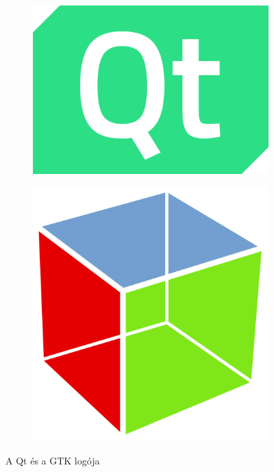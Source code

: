 \begin{figure}[h]
	\centering
	\begin{subfigure}{0.4\textwidth}
		\centering
		\includegraphics[keepaspectratio, scale=0.18]{figures/qt-logo}
	\end{subfigure}
	\hspace{0.075\textwidth}
	\begin{subfigure}{0.3\textwidth}
		\centering
		\includegraphics[keepaspectratio, scale=0.11]{figures/gtk-logo}
	\end{subfigure}
	\caption{A Qt és a GTK logója}
	\label{fig:qtgtklogo}
\end{figure}

